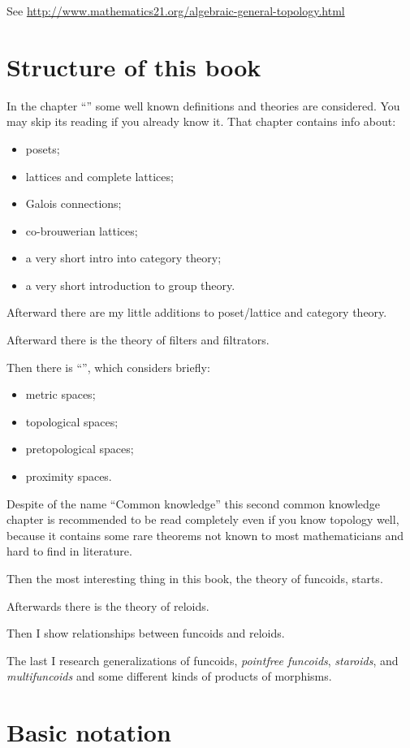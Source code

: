 See \url{http://www.mathematics21.org/algebraic-general-topology.html}


\section{Structure of this book}

In the chapter ``'' some well known definitions
and theories are considered. You may skip its reading if you already
know it. That chapter contains info about:
\begin{itemize}
\item posets;
\item lattices and complete lattices;
\item Galois connections;
\item co-brouwerian lattices;
\item a very short intro into category theory;
\item a very short introduction to group theory.
\end{itemize}
Afterward there are my little additions to poset/lattice and category
theory.

Afterward there is the theory of filters and filtrators.

Then there is ``'', which considers briefly:
\begin{itemize}
\item metric spaces;
\item topological spaces;
\item pretopological spaces;
\item proximity spaces.
\end{itemize}
Despite of the name ``Common knowledge'' this second common knowledge
chapter is recommended to be read completely even if you know topology
well, because it contains some rare theorems not known to most mathematicians
and hard to find in literature.

Then the most interesting thing in this book, the theory of funcoids,
starts.

Afterwards there is the theory of reloids.

Then I show relationships between funcoids and reloids.

The last I research generalizations of funcoids, \emph{pointfree funcoids},
\emph{staroids}, and \emph{multifuncoids} and some different kinds
of products of morphisms.


\section{Basic notation}

